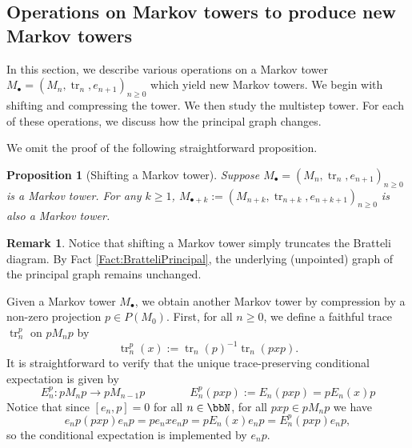 \documentclass[11pt]{article}
\theoremstyle{plain}
\newtheorem{prop}[thm]{Proposition}
\theoremstyle{definition}
\newtheorem{remark}[thm]{Remark}
\DeclareMathOperator{\tr}{tr}
\begin{document}
\subsection{Operations on Markov towers to produce new Markov towers}
\label{sec:OperationsOnMarkovTowers}

In this section, we describe various operations on a Markov tower $M_\bullet = (M_n, \tr_n, e_{n+1})_{n\geq 0}$ which yield new Markov towers.
We begin with shifting and compressing the tower.
We then study the multistep tower.
For each of these operations, we discuss how the principal graph changes. 

We omit the proof of the following straightforward proposition.
\begin{prop}[Shifting a Markov tower]
\label{prop:ShiftMarkovTower}
Suppose $M_\bullet=(M_n, \tr_n, e_{n+1})_{n\geq 0}$ is a Markov tower.
For any $k\geq 1$, $M_{\bullet+k}:=(M_{n+k}, \tr_{n+k}, e_{n+k+1})_{n\geq 0}$ is also a Markov tower.
\end{prop}

\begin{remark}
 \label{Rem:ShiftTowerEffects}
Notice that shifting a Markov tower simply truncates the Bratteli diagram.
By Fact \ref{Fact:BratteliPrincipal}, the underlying (unpointed) graph of the principal graph remains unchanged.
\end{remark}

Given a Markov tower $M_\bullet$, we obtain another Markov tower by compression by a non-zero projection $p\in P(M_0)$.
First, for all $n\geq 0$, we define a faithful trace $\tr_n^p$ on $pM_n p$ by
\begin{equation}
\label{eq:CompressedTrace}
\tr^p_n(x) := \tr_n(p)^{-1}\tr_n(pxp).
\end{equation}
It is straightforward to verify that the unique trace-preserving conditional expectation is given by 
\begin{equation}
\label{eq:CompressedConditionalExpectation}
E^p_n : pM_np \to pM_{n-1}p
\qquad
\qquad
E^p_n(pxp) := E_n(pxp) = pE_n(x)p
\end{equation}
Notice that since $[e_n,p] = 0$ for all $n\in \bbN$, for all $pxp \in pM_n p$ we have 
\begin{equation}
\label{eq:CompressionImplementsConditionalExpectation}
e_np (pxp) e_np = p e_nxe_np = pE_n(x)e_np = E_n^p(pxp)e_np,
\end{equation}
so the conditional expectation is implemented by $e_np$.
\end{document}
